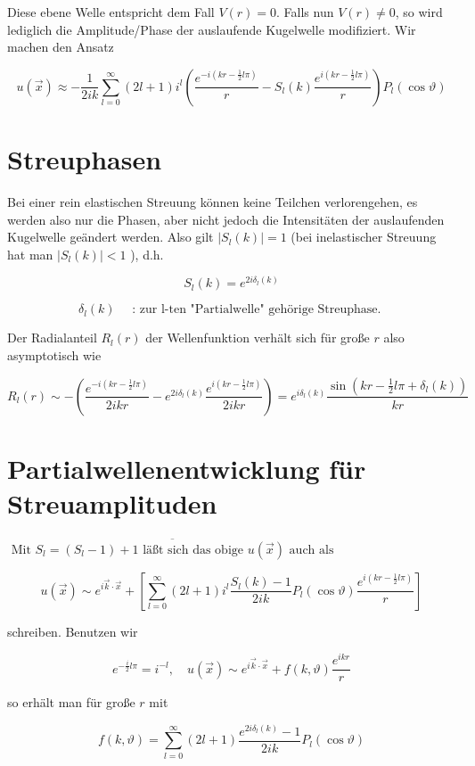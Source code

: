 \documentclass[10pt, letterpaper]{article}
\begin{document}
Diese ebene Welle entspricht dem Fall $V(r)=0$. Falls nun $V(r) \neq 0$, so wird lediglich die Amplitude/Phase der auslaufende Kugelwelle modifiziert. Wir machen den Ansatz

$$
u(\vec{x}) \approx-\frac{1}{2 i k} \sum_{l=0}^{\infty}(2 l+1) i^{l}\left(\frac{e^{-i\left(k r-\frac{1}{2} l \pi\right)}}{r}-S_{l}(k) \frac{e^{i\left(k r-\frac{1}{2} l \pi\right)}}{r}\right) P_{l}(\cos \vartheta)
$$

\section*{Streuphasen}
Bei einer rein elastischen Streuung können keine Teilchen verlorengehen, es werden also nur die Phasen, aber nicht jedoch die Intensitäten der auslaufenden Kugelwelle geändert werden. Also gilt $\left|S_{l}(k)\right|=1$ (bei inelastischer Streuung hat man $\left|S_{l}(k)\right|<1$ ), d.h.

$$
S_{l}(k)=e^{2 i \delta_{l}(k)}
$$

$$
\delta_{l}(k) \quad \text { : zur l-ten "Partialwelle" gehörige Streuphase. }
$$

Der Radialanteil $R_{l}(r)$ der Wellenfunktion verhält sich für große $r$ also asymptotisch wie

$$
R_{l}(r) \sim-\left(\frac{e^{-i\left(k r-\frac{1}{2} l \pi\right)}}{2 i k r}-e^{2 i \delta_{l}(k)} \frac{e^{i\left(k r-\frac{1}{2} l \pi\right)}}{2 i k r}\right)=e^{i \delta_{l}(k)} \frac{\sin \left(k r-\frac{1}{2} l \pi+\delta_{l}(k)\right)}{k r}
$$

\section*{Partialwellenentwicklung für Streuamplituden}
$\overline{\text { Mit } S_{l}=\left(S_{l}-1\right)+1 \text { läßt sich das obige } u(\vec{x}) \text { auch als }}$

$$
u(\vec{x}) \sim e^{i \vec{k} \cdot \vec{x}}+\left[\sum_{l=0}^{\infty}(2 l+1) i^{l} \frac{S_{l}(k)-1}{2 i k} P_{l}(\cos \vartheta) \frac{e^{i\left(k r-\frac{1}{2} l \pi\right)}}{r}\right]
$$

schreiben. Benutzen wir

$$
e^{-\frac{i}{2} l \pi}=i^{-l}, \quad u(\vec{x}) \sim e^{i \vec{k} \cdot \vec{x}}+f(k, \vartheta) \frac{e^{i k r}}{r}
$$

so erhält man für große $r$ mit

$$
f(k, \vartheta)=\sum_{l=0}^{\infty}(2 l+1) \frac{e^{2 i \delta_{l}(k)}-1}{2 i k} P_{l}(\cos \vartheta)
$$
\end{document}
